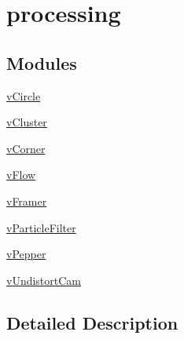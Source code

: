 \hypertarget{group__processing}{}\section{processing}
\label{group__processing}
\subsection*{Modules}
\begin{DoxyCompactItemize}
\item 
\hyperlink{group__vCircle}{v\+Circle}
\item 
\hyperlink{group__vCluster}{v\+Cluster}
\item 
\hyperlink{group__vCorner}{v\+Corner}
\item 
\hyperlink{group__vFlow}{v\+Flow}
\item 
\hyperlink{group__vFramer}{v\+Framer}
\item 
\hyperlink{group__vParticleFilter}{v\+Particle\+Filter}
\item 
\hyperlink{group__vPepper}{v\+Pepper}
\item 
\hyperlink{group__vUndistortCam}{v\+Undistort\+Cam}
\end{DoxyCompactItemize}


\subsection{Detailed Description}
